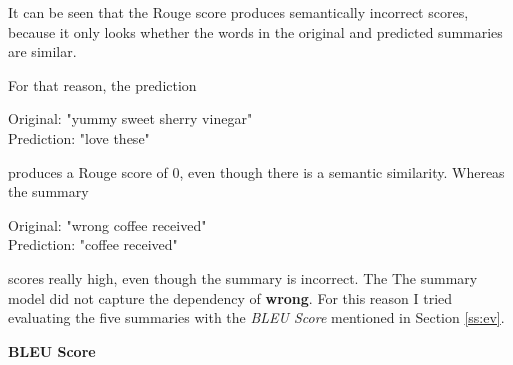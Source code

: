 It can be seen that the Rouge score produces semantically incorrect scores, because it only looks whether the words in the original and predicted summaries are similar. 

For that reason, the prediction 

\begin{tcolorbox}
	Original: "yummy sweet sherry vinegar" \\
	Prediction: "love these"
\end{tcolorbox}

produces a Rouge score of 0, even though there is a semantic similarity. Whereas the summary

\begin{tcolorbox}
	Original: "wrong coffee received" \\
	Prediction: "coffee received"
\end{tcolorbox}

scores really high, even though the summary is incorrect. The The summary model did not capture the dependency of \textbf{wrong}. For this reason I tried evaluating the five summaries with the \textit{BLEU Score} mentioned in Section \ref{ss:ev}.

\textbf{BLEU Score}

